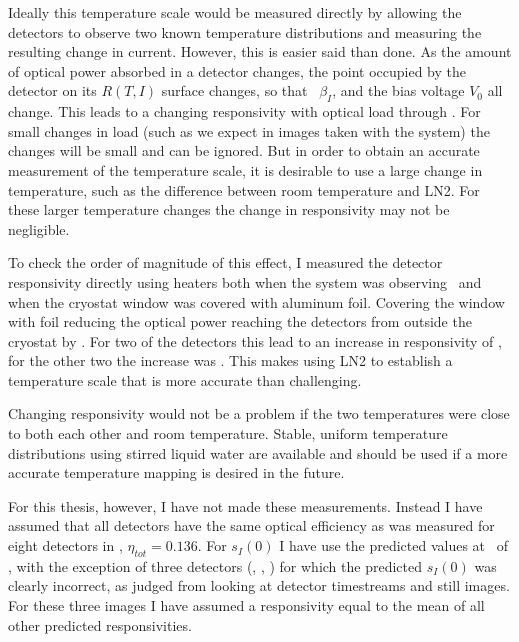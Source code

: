 Ideally this temperature scale would be measured directly by allowing the detectors to observe two known temperature distributions and measuring the resulting change in current.
However, this is easier said than done.
As the amount of optical power absorbed in a detector changes, the point occupied by the detector on its $R(T,I)$ surface changes, so that \Loop\, $\beta_I$, and the bias voltage $V_0$ all change.
This leads to a changing responsivity with optical load through .
For small changes in load (such as we expect in images taken with the system) the changes will be small and can be ignored.
But in order to obtain an accurate measurement of the temperature scale, it is desirable to use a large change in temperature, such as the difference between room temperature and LN2.
For these larger temperature changes the change in responsivity may not be negligible. 

To check the order of magnitude of this effect, I measured the detector responsivity directly using heaters both when the system was observing \ecco\ and when the cryostat window was covered with aluminum foil.
Covering the window with foil reducing the optical power reaching the detectors from outside the cryostat by .
For two of the detectors this lead to an increase in responsivity of , for the other two the increase was .
This makes using LN2 to establish a temperature scale that is more accurate than  challenging.

Changing responsivity would not be a problem if the two temperatures were close to both each other and room temperature.
Stable, uniform temperature distributions using stirred liquid water are available \cite{xxx grossman h20 standard} and should be used if a more accurate temperature mapping is desired in the future.

For this thesis, however, I have not made these measurements.
Instead I have assumed that all detectors have the same optical efficiency as was measured for eight detectors in , $\eta_{tot} = 0.136$.
For $s_I(0)$ I have use the predicted values at \SOC\ of , with the exception of three detectors (, , ) for which the predicted $s_I(0)$ was clearly incorrect, as judged from looking at detector timestreams and still images.
For these three images I have assumed a responsivity equal to the mean of all other predicted responsivities.

